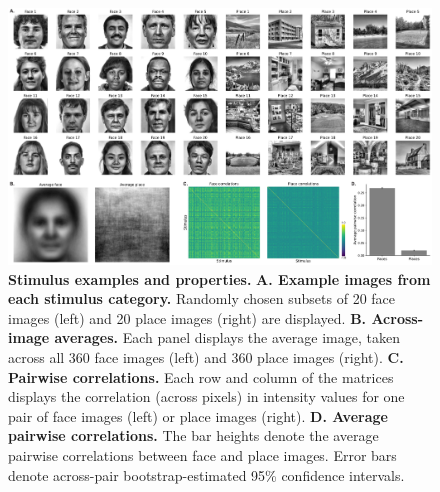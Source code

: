 \documentclass[english]{article}
\begin{document}
\begin{figure}[tp]
	\centering
	\includegraphics[width=\textwidth]{figs/stimuli}
  
  \caption{\textbf{Stimulus examples and properties.} \textbf{A. Example images
  from each stimulus category.} Randomly chosen subsets of 20 face images
  (left) and 20 place images (right) are displayed. \textbf{B. Across-image
  averages.} Each panel displays the average image, taken across all 360 face
  images (left) and 360 place images (right). \textbf{C. Pairwise
  correlations.} Each row and column of the matrices displays the correlation
  (across pixels) in intensity values for one pair of face images (left) or
  place images (right). \textbf{D. Average pairwise correlations.} The bar
  heights denote the average pairwise correlations between face and place
  images. Error bars denote across-pair bootstrap-estimated 95\%
  confidence intervals.}
  
  \label{fig:stimuli}
  \end{figure}
\end{document}

